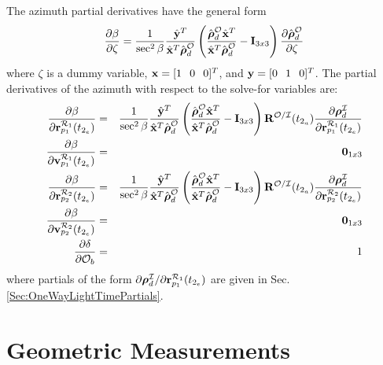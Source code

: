 The azimuth partial derivatives have the general form
%
\begin{equation}
    \frac{\partial \beta}{\partial \zeta} = \frac{1}{\sec^2{\beta}}\frac{\hat{\mathbf{y}}^T}{\hat{\mathbf{x}}^T\hat{\boldsymbol{\rho}}_d^\mcO}
    \left( \frac{\hat{\boldsymbol{\rho}}_d^\mcO    \hat{\mathbf{x}}^T}{\hat{\mathbf{x}}^T\hat{\boldsymbol{\rho}}_d^\mcO} -\mathbf{I}_{3x3} \right)\frac{\partial \hat{\boldsymbol{\rho}}_d^\mcO}{\partial \zeta}
\end{equation}
%
where $\zeta$ is a dummy variable, $\mathbf{x} = [1 \hspace{.1 in} 0
\hspace{0.1 in} 0]^T$, and $\mathbf{y} = [0 \hspace{.1 in} 1
\hspace{0.1 in} 0]^T$.  The partial derivatives of the azimuth with
respect to the solve-for variables are:
%
\begin{eqnarray}
    \frac{\partial \beta}{\partial \mathbf{r}^{\mcR_1}_{p_1}(t_{2_e})} & = & 
    \frac{1}{\sec^2{\beta}}\frac{\hat{\mathbf{y}}^T}{\hat{\mathbf{x}}^T\hat{\boldsymbol{\rho}}_d^\mcO}
    \left( \frac{\hat{\boldsymbol{\rho}}_d^\mcO    \hat{\mathbf{x}}^T}{\hat{\mathbf{x}}^T\hat{\boldsymbol{\rho}}_d^\mcO} -\mathbf{I}_{3x3} \right)\mathbf{R}^{{\mcO}/{\mcI}}(t_{2_{a}})\frac{\partial  \boldsymbol{\rho}_d^{\mcI}  }{\partial \mathbf{r}^{\mcR_1}_{p_1}(t_{2_e})}\\
    \frac{\partial \beta}{\partial \mathbf{v}^{\mcR_1}_{p_1}(t_{2_e})} & = & \mathbf{0}_{1x3} \\
    \frac{\partial \beta}{\partial \mathbf{r}^{\mcR_2}_{p_2}(t_{2_e})} & = &
      \frac{1}{\sec^2{\beta}}\frac{\hat{\mathbf{y}}^T}{\hat{\mathbf{x}}^T\hat{\boldsymbol{\rho}}_d^\mcO}
    \left( \frac{\hat{\boldsymbol{\rho}}_d^\mcO    \hat{\mathbf{x}}^T}{\hat{\mathbf{x}}^T\hat{\boldsymbol{\rho}}_d^\mcO} -\mathbf{I}_{3x3} \right)\mathbf{R}^{{\mcO}/{\mcI}}(t_{2_{a}})\frac{\partial  \boldsymbol{\rho}_d^{\mcI}  }{\partial \mathbf{r}^{\mcR_2}_{p_2}(t_{2_e})}\\
    \frac{\partial \beta}{\partial \mathbf{v}^{\mcR_2}_{p_2}(t_{2_e})} & = & \mathbf{0}_{1x3}\\
    \frac{\partial \delta}{\partial  \mathcal{O}_b } & = & 1
\end{eqnarray}
%
where partials of the form $\partial  \boldsymbol{\rho}_d^{\mcI}  /\partial \mathbf{r}^{\mcR_1}_{p_1}(t_{2_e})$ are given in Sec. \ref{Sec:OneWayLightTimePartials}.

\section{Geometric Measurements}

